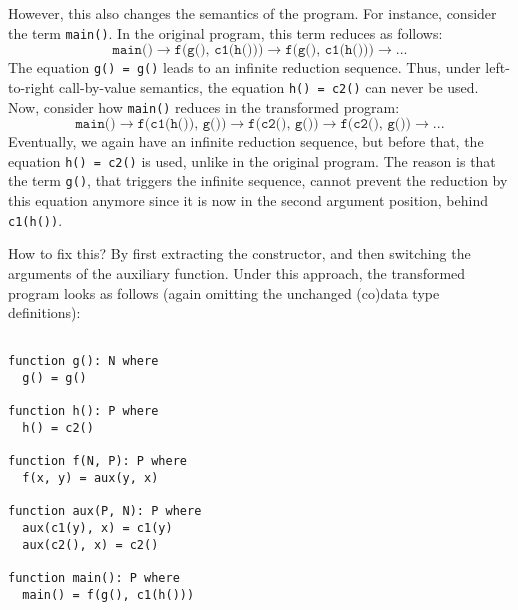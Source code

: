However, this also changes the semantics of the program. For instance, consider the term \texttt{main()}. In the original program, this term reduces as follows:
\[
\texttt{main()} \longrightarrow \texttt{f(g(), c1(h()))} \longrightarrow \texttt{f(g(), c1(h()))} \longrightarrow ...
\]
The equation \texttt{g() = g()} leads to an infinite reduction sequence. Thus, under left-to-right call-by-value semantics, the equation \texttt{h() = c2()} can never be used. Now, consider how \texttt{main()} reduces in the transformed program:
\[
\texttt{main()} \longrightarrow \texttt{f(c1(h()), g())} \longrightarrow \texttt{f(c2(), g())} \longrightarrow \texttt{f(c2(), g())} \longrightarrow ...
\]
Eventually, we again have an infinite reduction sequence, but before that, the equation \texttt{h() = c2()} is used, unlike in the original program. The reason is that the term \texttt{g()}, that triggers the infinite sequence, cannot prevent the reduction by this equation anymore since it is now in the second argument position, behind \texttt{c1(h())}.

How to fix this? By first extracting the constructor, and then switching the arguments of the auxiliary function. Under this approach, the transformed program looks as follows (again omitting the unchanged (co)data type definitions):

\begin{lstlisting}

function g(): N where
  g() = g()

function h(): P where
  h() = c2()

function f(N, P): P where
  f(x, y) = aux(y, x)

function aux(P, N): P where
  aux(c1(y), x) = c1(y)
  aux(c2(), x) = c2()

function main(): P where
  main() = f(g(), c1(h()))

\end{lstlisting}

